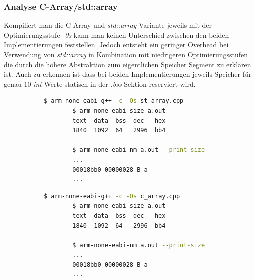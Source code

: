 \documentclass[MES,Master,ngerman]{twbook}%
\begin{document}
\begin{figure}[!htb]
	\begin{subfigure}[b]{0.5\textwidth}
		
		\label{fig:7}
	\end{subfigure}
	\begin{subfigure}[b]{0.5\textwidth}
		
		\label{fig:8}
	\end{subfigure}
\end{figure}

\subsubsection{Analyse C-Array/std::array}
Kompiliert man die C-Array und \textit{std::array} Variante jeweils mit der Optimierungsstufe \textit{-0s} kann man keinen Unterschied zwischen den beiden Implementierungen feststellen. Jedoch entsteht ein geringer Overhead bei Verwendung von \textit{std::array} in Kombination mit niedrigeren Optimierungsstufen die durch die höhere Abstraktion zum eigentlichen Speicher Segment zu erklären ist. Auch zu erkennen ist dass bei beiden Implementierungen jeweils Speicher für genau 10 \textit{int} Werte statisch in der \textit{.bss} Sektion reserviert wird.


\begin{figure}[!htb]
	\begin{subfigure}[b]{0.5\textwidth}
		\begin{lstlisting}[gobble=6, title={std::array}, language=bash, numbers=none]
		$ arm-none-eabi-g++ -c -Os st_array.cpp
		$ arm-none-eabi-size a.out
		text  data  bss  dec   hex
		1840  1092  64   2996  bb4
		
		$ arm-none-eabi-nm a.out --print-size
		...
		00018bb0 00000028 B a
		...
		\end{lstlisting}
	\end{subfigure}
	\begin{subfigure}[b]{0.5\textwidth}
		\begin{lstlisting}[gobble=6, title={C-Array}, language=bash, numbers=none]
		$ arm-none-eabi-g++ -c -Os c_array.cpp
		$ arm-none-eabi-size a.out
		text  data  bss  dec   hex
		1840  1092  64   2996  bb4
		
		$ arm-none-eabi-nm a.out --print-size
		...
		00018bb0 00000028 B a
		...
		\end{lstlisting}
	\end{subfigure}
\end{figure}
\end{document}
